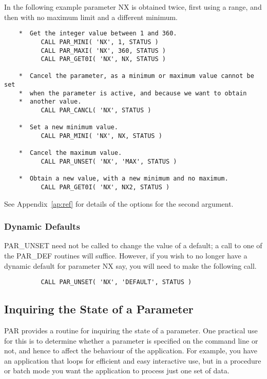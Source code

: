 \documentclass[twoside,11pt]{article}
\newcommand{\xlabel}[1]{}
\begin{document}
In the following example parameter NX is obtained twice, first using a
range, and then with no maximum limit and a different minimum.

\begin{verbatim}
    *  Get the integer value between 1 and 360.
          CALL PAR_MINI( 'NX', 1, STATUS )
          CALL PAR_MAXI( 'NX', 360, STATUS )
          CALL PAR_GET0I( 'NX', NX, STATUS )

    *  Cancel the parameter, as a minimum or maximum value cannot be set
    *  when the parameter is active, and because we want to obtain 
    *  another value.
          CALL PAR_CANCL( 'NX', STATUS )

    *  Set a new minimum value.
          CALL PAR_MINI( 'NX', NX, STATUS )

    *  Cancel the maximum value.
          CALL PAR_UNSET( 'NX', 'MAX', STATUS )

    *  Obtain a new value, with a new minimum and no maximum.
          CALL PAR_GET0I( 'NX', NX2, STATUS )
\end{verbatim}

See Appendix~\ref{ap:ref} for details of the options for the second
argument. 

\subsubsection{Dynamic Defaults}

PAR\_UNSET need not be called to change the value of a default; a call
to one of the PAR\_DEF routines will suffice.  However, if you wish to
no longer have a dynamic default for parameter NX say, you will need to
make the following call. 

\begin{verbatim}
          CALL PAR_UNSET( 'NX', 'DEFAULT', STATUS )
\end{verbatim}

\subsection{\xlabel{inquiring_the_state_of_a_parameter}Inquiring the State of a Parameter}

PAR provides a routine for inquiring the state of a parameter.
One practical use for this is to determine whether a parameter is 
specified on the command line or not, and hence to affect the behaviour
of the application.  For example, you have an application that loops for
efficient and easy interactive use, but in a procedure or batch mode you
want the application to process just one set of data.
\end{document}
